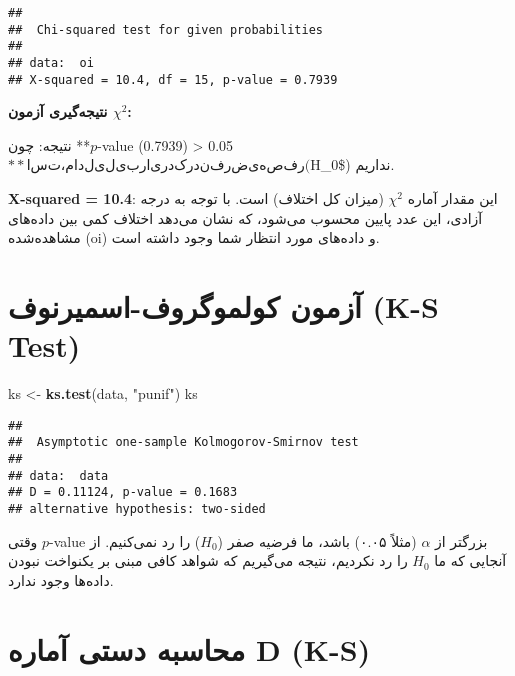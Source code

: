 \documentclass[
  persian,
]{article}
\newenvironment{Shaded}{\begin{snugshade}}{\end{snugshade}}
\newcommand{\FunctionTok}[1]{\textcolor[rgb]{0.13,0.29,0.53}{\textbf{#1}}}
\newcommand{\NormalTok}[1]{#1}
\newcommand{\OtherTok}[1]{\textcolor[rgb]{0.56,0.35,0.01}{#1}}
\newcommand{\StringTok}[1]{\textcolor[rgb]{0.31,0.60,0.02}{#1}}
\begin{document}
\persian\latin

\begin{verbatim}
## 
##  Chi-squared test for given probabilities
## 
## data:  oi
## X-squared = 10.4, df = 15, p-value = 0.7939
\end{verbatim}

\persian

\textbf{نتیجه‌گیری آزمون \(\chi^2\):}

نتیجه: چون **\(p\)-value (0.7939) \textgreater{}
0.05\(** است، ما دلیلی برای رد کردن فرضیه صفر (\)H\_0\$) نداریم.

\textbf{X-squared = 10.4}: این مقدار آماره \(\chi^2\) (میزان کل اختلاف)
است. با توجه به درجه آزادی، این عدد پایین محسوب می‌شود، که نشان می‌دهد
اختلاف کمی بین داده‌های مشاهده‌شده (oi) و داده‌های مورد انتظار شما وجود
داشته است.

\section{آزمون کولموگروف-اسمیرنوف (K-S
Test)}\label{ux622ux632ux645ux648ux646-ux6a9ux648ux644ux645ux648ux6afux631ux648ux641-ux627ux633ux645ux6ccux631ux646ux648ux641-k-s-test}

\latin

\begin{Shaded}
\begin{Highlighting}[]
\NormalTok{ks }\OtherTok{\textless{}{-}} \FunctionTok{ks.test}\NormalTok{(data, }\StringTok{"punif"}\NormalTok{)}
\NormalTok{ks}
\end{Highlighting}
\end{Shaded}

\persian\latin

\begin{verbatim}
## 
##  Asymptotic one-sample Kolmogorov-Smirnov test
## 
## data:  data
## D = 0.11124, p-value = 0.1683
## alternative hypothesis: two-sided
\end{verbatim}

\persian

وقتی \(p\)-value بزرگتر از \(\alpha\) (مثلاً ۰.۰۵) باشد، ما فرضیه صفر
(\(H_0\)) را رد نمی‌کنیم. از آنجایی که ما \(H_0\) را رد نکردیم، نتیجه
می‌گیریم که شواهد کافی مبنی بر یکنواخت نبودن داده‌ها وجود ندارد.

\section{محاسبه دستی آماره D
(K-S)}\label{ux645ux62dux627ux633ux628ux647-ux62fux633ux62aux6cc-ux622ux645ux627ux631ux647-d-k-s}
\end{document}
